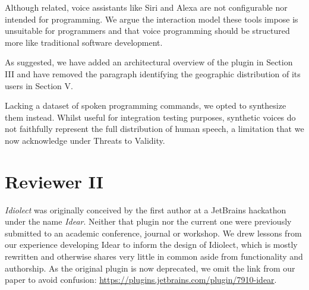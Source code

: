 \documentclass[journal,12pt,onecolumn,draftclsnofoot,]{IEEEtran}
\begin{document}
%
%
%

Although related, voice assistants like Siri and Alexa are not configurable nor intended for programming. We argue the interaction model these tools impose is unsuitable for programmers and that voice programming should be structured more like traditional software development.

As suggested, we have added an architectural overview of the plugin in Section III and have removed the paragraph identifying the geographic distribution of its users in Section V.



Lacking a dataset of spoken programming commands, we opted to synthesize them instead. Whilst useful for integration testing purposes, synthetic voices do not faithfully represent the full distribution of human speech, a limitation that we now acknowledge under Threats to Validity.

\section{Reviewer II}

\textit{Idiolect} was originally conceived by the first author at a JetBrains hackathon under the name \textit{Idear}. Neither that plugin nor the current one were previously submitted to an academic conference, journal or workshop. We drew lessons from our experience developing Idear to inform the design of Idiolect, which is mostly rewritten and otherwise shares very little in common aside from functionality and authorship. As the original plugin is now deprecated, we omit the link from our paper to avoid confusion: \url{https://plugins.jetbrains.com/plugin/7910-idear}.
\end{document}
